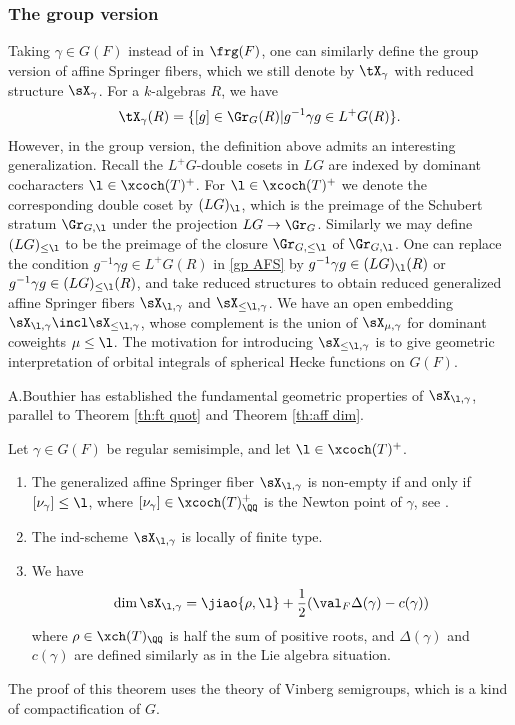 \subsubsection{The group version} Taking $\gamma\in G(F)$ instead of in $\frg(F)$, one can similarly define the group version of  affine Springer fibers, which we still denote by $\tX_{\gamma}$ with reduced structure $\sX_{\gamma}$. For a $k$-algebras $R$, we have
\begin{equation}\label{gp AFS}
\tX_{\gamma}(R)=\{[g]\in \Gr_{G}(R)|g^{-1}\gamma g\in L^{+}G(R)\}.
\end{equation}
However, in the group version, the definition above admits an interesting generalization. Recall the $L^{+}G$-double cosets in $LG$ are indexed by dominant cocharacters $\l\in\xcoch(T)^{+}$. For $\l\in\xcoch(T)^{+}$ we denote the corresponding double coset by $(LG)_{\l}$, which is the preimage of the Schubert stratum $\Gr_{G,\l}$ under the projection $LG\to \Gr_{G}$. Similarly we may define $(LG)_{\leq \l}$ to be the preimage of the closure $\Gr_{G,\leq \l}$ of $\Gr_{G,\l}$. One can replace the condition $g^{-1}\gamma g\in L^{+}G(R)$ in \eqref{gp AFS} by $g^{-1}\gamma g\in (LG)_{\l}(R)$ or $g^{-1}\gamma g\in (LG)_{\leq\l}(R)$, and take reduced structures to obtain reduced generalized affine Springer fibers $\sX_{\l,\gamma}$ and $\sX_{\leq\l, \gamma}$. We have an open embedding $\sX_{\l,\gamma}\incl\sX_{\leq\l,\gamma}$, whose complement is the union of $\sX_{\mu,\gamma}$ for dominant coweights $\mu\leq\l$. The motivation for introducing $\sX_{\leq\l,\gamma}$ is to give geometric interpretation of orbital integrals of spherical Hecke functions on $G(F)$. 


A.Bouthier has established the fundamental geometric properties of $\sX_{\l,\gamma}$, parallel to Theorem \ref{th:ft quot} and Theorem \ref{th:aff dim}. 

\begin{theorem}  Let $\gamma\in G(F)$ be regular semisimple, and let $\l\in\xcoch(T)^{+}$.
\begin{enumerate}
\item The generalized affine Springer fiber $\sX_{\l,\gamma}$ is non-empty if and only if $[\nu_{\gamma}]\leq\l$, where $[\nu_{\gamma}]\in\xcoch(T)^{+}_{\QQ}$ is the Newton point of $\gamma$, see \cite[\S2]{KV}.
\item The ind-scheme $\sX_{\l,\gamma}$ is locally of finite type.
\item We have
\begin{equation*}
\dim\sX_{\l,\gamma}=\jiao{\rho,\l}+\frac{1}{2}(\val_{F}\Delta(\gamma)-c(\gamma))
\end{equation*}
where $\rho\in\xch(T)_{\QQ}$ is half the sum of positive roots, and $\Delta(\gamma)$ and $c(\gamma)$ are defined similarly as in the Lie algebra situation.
\end{enumerate}
\end{theorem}
The proof of this theorem uses the theory of Vinberg semigroups, which is a kind of compactification of $G$.


